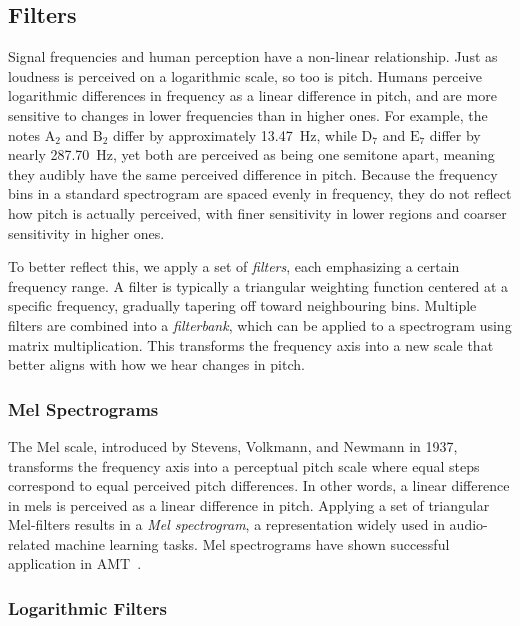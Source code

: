 \subsection{Filters}

Signal frequencies and human perception have a non-linear relationship. Just as loudness is perceived on a logarithmic scale, so too is pitch. Humans perceive logarithmic differences in frequency as a linear difference in pitch, and are more sensitive to changes in lower frequencies than in higher ones. For example, the notes $\text{A}_2$ and $\text{B}_2$ differ by approximately 13.47~Hz, while $\text{D}_7$ and $\text{E}_7$ differ by nearly 287.70~Hz, yet both are perceived as being one semitone apart, meaning they audibly have the same perceived difference in pitch. Because the frequency bins in a standard spectrogram are spaced evenly in frequency, they do not reflect how pitch is actually perceived, with finer sensitivity in lower regions and coarser sensitivity in higher ones.

To better reflect this, we apply a set of \textit{filters}, each emphasizing a certain frequency range. A filter is typically a triangular weighting function centered at a specific frequency, gradually tapering off toward neighbouring bins. Multiple filters are combined into a \textit{filterbank}, which can be applied to a spectrogram using matrix multiplication. This transforms the frequency axis into a new scale that better aligns with how we hear changes in pitch.

\subsubsection{Mel Spectrograms}

The Mel scale, introduced by Stevens, Volkmann, and Newmann in 1937, transforms the frequency axis into a perceptual pitch scale where equal steps correspond to equal perceived pitch differences. In other words, a linear difference in mels is perceived as a linear difference in pitch. Applying a set of triangular Mel-filters results in a \textit{Mel spectrogram}, a representation widely used in audio-related machine learning tasks. Mel spectrograms have shown successful application in \gls{AMT}~\cite{gardner2022mt3multitaskmultitrackmusic, chang2024yourmt3+, gong2021astaudiospectrogramtransformer, wolfmonheim2024spectralrhythmfeaturesaudio, 8350302}.

\subsubsection{Logarithmic Filters}

